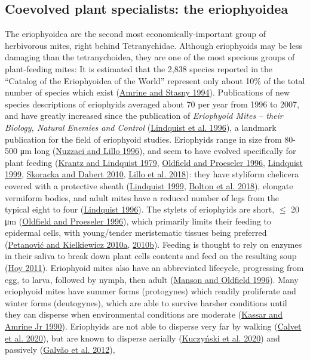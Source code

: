 \documentclass{ufdissertation}[overrideChapters] %
\begin{document}
{\hypertarget{coevolved-plant-specialists-the-eriophyoidea}{%
\subsection{Coevolved plant specialists: the eriophyoidea}\label{coevolved-plant-specialists-the-eriophyoidea}}

The eriophyoidea are the second most economically-important group of herbivorous mites, right behind Tetranychidae. Although eriophyoids may be less damaging than the tetranychoidea, they are one of the most specious groups of plant-feeding mites: It is estimated that the 2,838 species reported in the ``Catalog of the Eriophyoidea of the World'' represent only about 10\% of the total number of species which exist (\protect\hyperlink{ref-Amrine1994}{Amrine and Stasny 1994}). Publications of new species descriptions of eriophyids averaged about 70 per year from 1996 to 2007, and have greatly increased since the publication of \emph{Eriophyoid Mites -- their Biology, Natural Enemies and Control} (\protect\hyperlink{ref-Lindquist1996}{Lindquist et al. 1996}), a landmark publication for the field of eriophyoid studies. Eriophyids range in size from 80-500 \si{\micro\metre} long (\protect\hyperlink{ref-Nuzzaci1996}{Nuzzaci and Lillo 1996}), and seem to have evolved specifically for plant feeding (\protect\hyperlink{ref-Krantz1979}{Krantz and Lindquist 1979}, \protect\hyperlink{ref-Oldfield1996a}{Oldfield and Proeseler 1996}, \protect\hyperlink{ref-Lindquist1999}{Lindquist 1999}, \protect\hyperlink{ref-Skoracka2010}{Skoracka and Dabert 2010}, \protect\hyperlink{ref-Lillo2018}{Lillo et al. 2018}): they have styliform chelicera covered with a protective sheath (\protect\hyperlink{ref-Lindquist1999}{Lindquist 1999}, \protect\hyperlink{ref-Bolton2018}{Bolton et al. 2018}), elongate vermiform bodies, and adult mites have a reduced number of legs from the typical eight to four (\protect\hyperlink{ref-Lindquist1996a}{Lindquist 1996}). The stylets of eriophyids are short, \(\le\) 20 \si{\micro\metre} (\protect\hyperlink{ref-Oldfield1996a}{Oldfield and Proeseler 1996}), which primarily limits their feeding to epidermal cells, with young/tender meristematic tissues being preferred (\protect\hyperlink{ref-Petanovic2010}{Petanović and Kielkiewicz 2010a}, \protect\hyperlink{ref-Petanovic2010a}{2010b}). Feeding is thought to rely on enzymes in their saliva to break down plant cells contents and feed on the resulting soup (\protect\hyperlink{ref-Hoy2011}{Hoy 2011}). Eriophyoid mites also have an abbreviated lifecycle, progressing from egg, to larva, followed by nymph, then adult (\protect\hyperlink{ref-Manson1996}{Manson and Oldfield 1996}). Many eriophyoid mites have summer forms (protogynes) which readily proliferate and winter forms (deutogynes), which are able to survive harsher conditions until they can disperse when environmental conditions are moderate (\protect\hyperlink{ref-Kassar1990}{Kassar and Amrine Jr 1990}). Eriophyids are not able to disperse very far by walking (\protect\hyperlink{ref-Calvet2020}{Calvet et al. 2020}), but are known to disperse aerially (\protect\hyperlink{ref-Kuczynski2020}{Kuczyński et al. 2020}) and passively (\protect\hyperlink{ref-Galvao2012}{Galvão et al. 2012}), }
\end{document}
